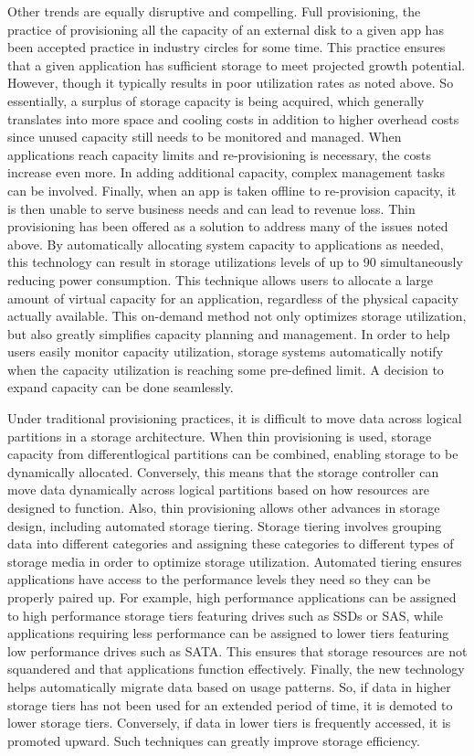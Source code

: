 \documentclass[11pt]{article}
\begin{document}
Other trends are equally disruptive and compelling. Full provisioning, the 
practice of provisioning all the capacity of an external disk to a given app 
has been accepted practice in industry circles for some time. This practice 
ensures that a given application has sufficient storage to meet projected 
growth potential. However, though it typically results in poor utilization 
rates as noted above. So essentially, a surplus of storage capacity is being 
acquired, which generally translates into more space and cooling costs in 
addition to higher overhead costs since unused capacity still needs to be 
monitored and managed. When applications reach capacity limits and 
re-provisioning is necessary, the costs increase even more. In adding 
additional capacity, complex management tasks can be involved. Finally, when 
an app is taken offline to re-provision capacity, it is then unable to serve 
business needs and can lead to revenue loss. Thin provisioning has been 
offered as a solution to address many of the issues noted above. By 
automatically allocating system capacity to applications as needed, this 
technology can result in storage utilizations levels of up to 90%
simultaneously reducing power consumption. This technique allows users to 
allocate a large amount of virtual capacity for an application, regardless 
of the physical capacity actually available. This on-demand method not only 
optimizes storage utilization, but also greatly simplifies capacity planning 
and management. In order to help users easily monitor capacity utilization, 
storage systems automatically notify when the capacity utilization is reaching 
some pre-defined limit. A decision to expand capacity can be done seamlessly. 

Under traditional provisioning practices, it is difficult to move data across logical 
partitions in a storage architecture. When thin provisioning is used, storage capacity 
from differentlogical partitions can be combined, enabling storage to be dynamically 
allocated. Conversely, this means that the storage controller can move data dynamically 
across logical partitions based on how resources are designed to function. Also, thin 
provisioning allows other advances in storage design, including automated storage tiering. 
Storage tiering involves grouping data into different categories and assigning these 
categories to different types of storage media in order to optimize storage utilization. 
Automated tiering ensures applications have access to the performance levels they need so 
they can be properly paired up. For example, high performance applications can be assigned 
to high performance storage tiers featuring drives such as SSDs or SAS, while applications 
requiring less performance can be assigned to lower tiers featuring low performance drives 
such as SATA. This ensures that storage resources are not squandered and that applications 
function effectively. Finally, the new technology helps automatically migrate data based on 
usage patterns. So, if data in higher storage tiers has not been used for an extended period 
of time, it is demoted to lower storage tiers. Conversely, if data in lower tiers is 
frequently accessed, it is promoted upward. Such techniques can greatly improve storage 
efficiency.
\end{document}
